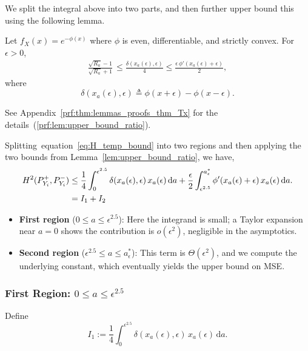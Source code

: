 \documentclass[10pt]{article} %
\def\eqref#1{equation~\ref{#1}}
\theoremstyle{plain}
\theoremstyle{definition}
\theoremstyle{remark}
\newcommand{\dx}{\mathrm{d}}
\begin{document}
We split the integral above into two parts, and then 
 further upper bound this using the following lemma.
\begin{lemma}\label{lem:upper_bound_ratio}
Let \( f_X(x) = e^{-\phi(x)} \) where \( \phi  \) is even, differentiable, and strictly convex.  
For \( \epsilon > 0 \), 
\begin{align}
\frac{\sqrt{R_a} - 1}{\sqrt{R_a} + 1} \,
    \leq \frac{\delta(x_a(\epsilon),\epsilon)}{4}\leq \frac{\epsilon \, \phi'(x_a(\epsilon) + \epsilon)}{2},\label{eq:frac_Ma_bound}
\end{align}
where 
\[
\delta(x_a(\epsilon),\epsilon)\triangleq \phi(x+\epsilon)-\phi(x-\epsilon).
\]
\end{lemma}
See Appendix~\ref{prf:thm:lemmas_proofs_thm_Tx} for the details~(\ref{prf:lem:upper_bound_ratio}).

Splitting~\eqref{eq:H_temp_bound} into two regions and then applying the two bounds from  Lemma~\ref{lem:upper_bound_ratio}, we have,
\begin{align}
H^2(P_{Y_i}^+, P_{Y_i}^-) 
&\leq \frac{1}{4} \int_0^{\epsilon^{2.5}} \delta(x_a(\epsilon), \epsilon) \, x_a(\epsilon) \, \dx a
+ \frac{\epsilon}{2} \int_{\epsilon^{2.5}}^{a_{\epsilon}^*} \phi'(x_a(\epsilon) + \epsilon) \, x_a(\epsilon) \, \dx a. \notag \\
&= I_1 + I_2
\end{align}

\begin{itemize}
    \item \textbf{First region} (\(0 \leq a \leq \epsilon^{2.5}\)):  
    Here the integrand is small; a Taylor expansion near $a=0$ shows the contribution is $o(\epsilon^2)$, negligible in the asymptotics.
    
    \item \textbf{Second region} (\(\epsilon^{2.5} \leq a \leq a_{\epsilon}^*\)):  
    This term is $\Theta(\epsilon^2)$, and we compute the underlying constant, which eventually yields the upper bound on MSE.
\end{itemize}

\subsubsection*{First Region: \(0 \le a \le \epsilon^{2.5}\)}\label{part1:region1}
Define
\[
I_1 := \frac{1}{4} \int_0^{\epsilon^{2.5}} \delta(x_a(\epsilon), \epsilon)\, x_a(\epsilon) \, \dx a.
\]
\end{document}
